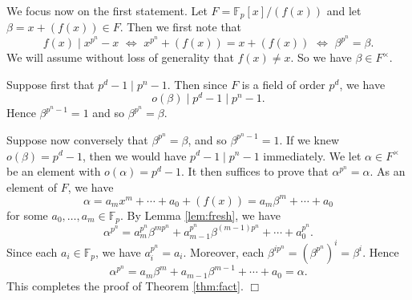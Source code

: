 \documentclass{article}
\def\F{{\mathbb F}}
\def\F{{\mathbb F}}
\begin{document}
We focus now on the first statement. Let $F = \F_p[x]/(f(x))$ and let $\beta = x + (f(x))\in F$. Then we first note that
$$f(x)\mid x^{p^n}-x\,\,\Longleftrightarrow\,\, x^{p^n}+(f(x)) = x + (f(x))\,\,\Longleftrightarrow\,\, \beta^{p^n}=\beta.$$
We will assume without loss of generality that $f(x)\neq x$. So we have $\beta\in F^\times$.

Suppose first that $p^d - 1 \mid p^n - 1$. Then since $F$ is a field of order $p^d$, we have $$o(\beta)\mid p^d - 1\mid p^n - 1.$$
Hence $\beta^{p^n - 1} = 1$ and so $\beta^{p^n} = \beta$.

Suppose now conversely that $\beta^{p^n} = \beta$, and so $\beta^{p^n-1} = 1$. If we knew $o(\beta) = p^d - 1$, then we would have $p^d - 1\mid p^n - 1$ immediately. We let $\alpha\in F^\times$ be an element with $o(\alpha) = p^d - 1$. It then suffices to prove that $\alpha^{p^n} = \alpha$. As an element of $F$, we have
$$\alpha = a_mx^m + \cdots + a_0  + (f(x)) = a_m\beta^m + \cdots + a_0$$
for some $a_0,\ldots,a_m\in\F_p$. By Lemma \ref{lem:fresh}, we have
$$\alpha^{p^n} = a_m^{p^n}\beta^{mp^n} + a_{m-1}^{p^n}\beta^{(m-1)p^n} + \cdots + a_0^{p^n}.$$
Since each $a_i\in \F_p$, we have $a_i^{p^n} = a_i$. Moreover, each $\beta^{ip^n} = (\beta^{p^n})^i = \beta^i$. Hence
$$\alpha^{p^n} = a_m\beta^m + a_{m-1}\beta^{m-1} + \cdots + a_0 = \alpha.$$
This completes the proof of Theorem \ref{thm:fact}. $\Box$

\begin{comment}
We first prove that if $f(x)\in\F_p[x]$ is a monic irreducible polynomial of degree $d\mid n$, then $x^{p^n} - x \in (f(x))$. If $d = 1$, then $f(x) = x - a$ for some $a\in\F_p$, in which case we know $x-a\mid x^{p^n}-x$ because $a^{p^n} = a$. Suppose now $d\geq 2$. Let $F = \F_p[x]/(f(x))$. Let $\alpha = x + (f(x))$. Then $\alpha\neq 0$ and so $\alpha^{p^d-1} = 1$. Since $d\mid n$, we know that $p^d - 1 \mid p^n - 1$. Hence $\alpha^{p^n - 1} = 1$. So $\alpha^{p^n} = \alpha$. This means that $x^{p^n} - x \in (f(x))$. 

Conversely, suppose $x^{p^n} - x\in(f(x))$ for some irreducible polynomial $f(x)\in\F_p[x]$ of degree $d$. We prove $d\mid n$. Again let $F = \F_p[x]/(f(x))$. Let $\alpha = a(x) + (f(x))$ be a primitive element so that $o(\alpha) = p^d - 1$. We would be done if we can prove that $\alpha^{p^n} = \alpha$, which implies that $\alpha^{p^n-1}=1$ and so $p^d - 1\mid p^n - 1$. We note from last time that if $a(x)=a_mx^m + \cdots + a_0\in \F_p[x]$, we have $$a(x)^{p^n} = a_mx^{mp^n} + a_{m-1}x^{(m-1)p^n} + \cdots + a_0.$$
Now each $$x^{jp^n} - x^j = ((x^{p^n} - x) + x)^j - x^j \in (x^{p^n} - x)$$ and so also in $(f(x))$. Hence we see that $$a(x)^{p^n} - a(x) = \sum_{j=0}^m a_j(x^{jp^n} - x^j) \in (f(x)).$$ In other words, $\alpha^{p^n} = \alpha$ in $F$.

Finally, we need to prove that $x^{p^n} - x$ has no repeated factors, so that every monic irreducible polynomial of degree dividing $n$ appears exactly once in the factorization of $x^{p^n} - x$. This follows easily from $$(x^{p^n} - x)' = p^nx^{p^n - 1} - x = -1$$
which shares no common divisor with $x^{p^n} - x$. $\Box$
\end{comment}
\end{document}
